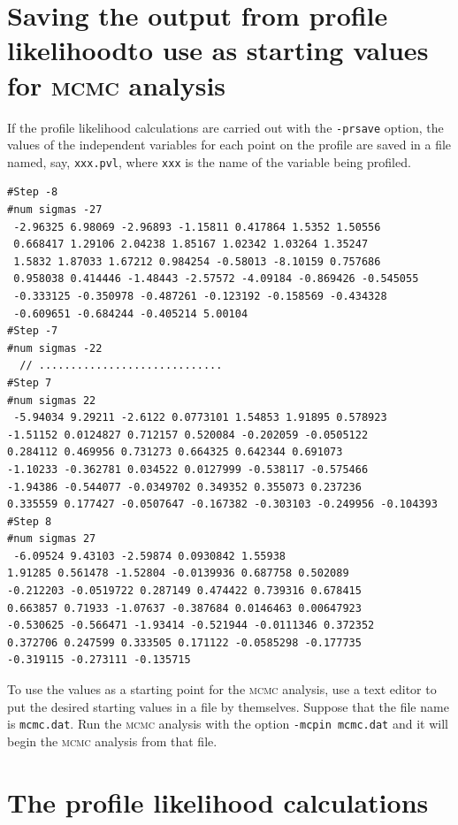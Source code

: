 \documentclass{admbmanual}
\newcommand\apl{profile likelihood}
\begin{document}
\section{Saving the output from \apl\br  to use as starting values
for \textsc{mcmc} analysis}

If the profile likelihood calculations are carried out with the
\texttt{-prsave} option, the values of the independent variables 
for each point on the profile are saved in a file named, say,
\texttt{xxx.pvl}, where \texttt{xxx} is the name of the variable
being profiled. 
\begin{lstlisting}
#Step -8
#num sigmas -27
 -2.96325 6.98069 -2.96893 -1.15811 0.417864 1.5352 1.50556 
 0.668417 1.29106 2.04238 1.85167 1.02342 1.03264 1.35247 
 1.5832 1.87033 1.67212 0.984254 -0.58013 -8.10159 0.757686 
 0.958038 0.414446 -1.48443 -2.57572 -4.09184 -0.869426 -0.545055 
 -0.333125 -0.350978 -0.487261 -0.123192 -0.158569 -0.434328 
 -0.609651 -0.684244 -0.405214 5.00104
#Step -7
#num sigmas -22
  // .............................
#Step 7
#num sigmas 22
 -5.94034 9.29211 -2.6122 0.0773101 1.54853 1.91895 0.578923 
-1.51152 0.0124827 0.712157 0.520084 -0.202059 -0.0505122 
0.284112 0.469956 0.731273 0.664325 0.642344 0.691073 
-1.10233 -0.362781 0.034522 0.0127999 -0.538117 -0.575466 
-1.94386 -0.544077 -0.0349702 0.349352 0.355073 0.237236 
0.335559 0.177427 -0.0507647 -0.167382 -0.303103 -0.249956 -0.104393
#Step 8
#num sigmas 27
 -6.09524 9.43103 -2.59874 0.0930842 1.55938 
1.91285 0.561478 -1.52804 -0.0139936 0.687758 0.502089 
-0.212203 -0.0519722 0.287149 0.474422 0.739316 0.678415 
0.663857 0.71933 -1.07637 -0.387684 0.0146463 0.00647923 
-0.530625 -0.566471 -1.93414 -0.521944 -0.0111346 0.372352 
0.372706 0.247599 0.333505 0.171122 -0.0585298 -0.177735 
-0.319115 -0.273111 -0.135715
\end{lstlisting}
To use the values as a starting point for the \textsc{mcmc} analysis,
use a text editor to put the desired starting values in a file
by themselves. Suppose that the file name is \texttt{mcmc.dat}.
Run the \textsc{mcmc} analysis with the option \texttt{-mcpin mcmc.dat}
and it will begin the \textsc{mcmc} analysis from that file. 


\section{The profile likelihood calculations}
\end{document}

